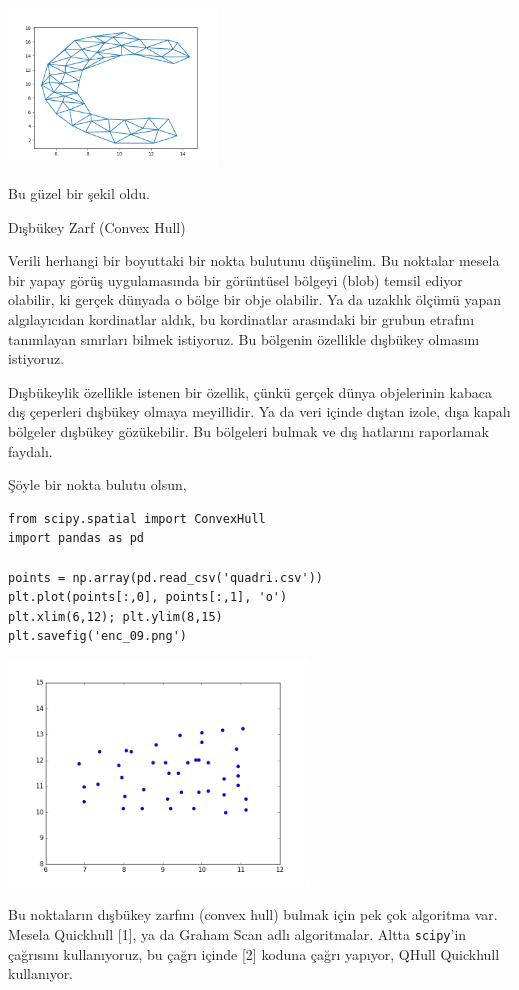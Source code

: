 \documentclass[12pt,fleqn]{article}\usepackage{../../common}
\begin{document}
\includegraphics[width=15em]{algs_075_enc_16.png}

Bu güzel bir şekil oldu.

Dışbükey Zarf (Convex Hull)

Verili herhangi bir boyuttaki bir nokta bulutunu düşünelim. Bu noktalar
mesela bir yapay görüş uygulamasında bir görüntüsel bölgeyi (blob) temsil
ediyor olabilir, ki gerçek dünyada o bölge bir obje olabilir. Ya da uzaklık
ölçümü yapan algılayıcıdan kordinatlar aldık, bu kordinatlar arasındaki bir
grubun etrafını tanımlayan sınırları bilmek istiyoruz. Bu bölgenin
özellikle dışbükey olmasını istiyoruz.

Dışbükeylik özellikle istenen bir özellik, çünkü gerçek dünya objelerinin
kabaca dış çeperleri dışbükey olmaya meyillidir. Ya da veri içinde dıştan
izole, dışa kapalı bölgeler dışbükey gözükebilir. Bu bölgeleri bulmak ve
dış hatlarını raporlamak faydalı.

Şöyle bir nokta bulutu olsun, 

\begin{verbatim}
from scipy.spatial import ConvexHull
import pandas as pd

points = np.array(pd.read_csv('quadri.csv'))
plt.plot(points[:,0], points[:,1], 'o')
plt.xlim(6,12); plt.ylim(8,15)
plt.savefig('enc_09.png')
\end{verbatim}

\includegraphics[height=6cm]{enc_09.png}

Bu noktaların dışbükey zarfını (convex hull) bulmak için pek çok algoritma
var. Mesela Quickhull [1], ya da Graham Scan adlı algoritmalar. Altta
\verb!scipy!'in çağrısını kullanıyoruz, bu çağrı içinde [2] koduna çağrı
yapıyor, QHull Quickhull kullanıyor.
\end{document}
